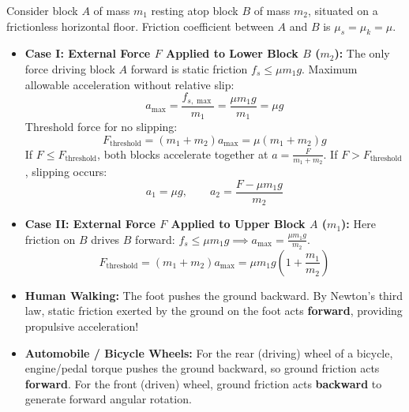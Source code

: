\documentclass[10pt,twoside,openright]{book}
\begin{document}
\begin{usecasebox}
Consider block $A$ of mass $m_1$ resting atop block $B$ of mass $m_2$, situated on a frictionless horizontal floor. Friction coefficient between $A$ and $B$ is $\mu_s = \mu_k = \mu$.
\begin{itemize}
  \item \textbf{Case I: External Force $F$ Applied to Lower Block $B$ ($m_2$):}
  The only force driving block $A$ forward is static friction $f_s \le \mu m_1 g$.
  Maximum allowable acceleration without relative slip:
  \begin{equation}
    a_{\max} = \frac{f_{s,\max}}{m_1} = \frac{\mu m_1 g}{m_1} = \mu g
  \end{equation}
  Threshold force for no slipping:
  \begin{equation}
    F_{\text{threshold}} = (m_1 + m_2)a_{\max} = \mu(m_1 + m_2)g
  \end{equation}
  If $F \le F_{\text{threshold}}$, both blocks accelerate together at $a = \frac{F}{m_1 + m_2}$.
  If $F > F_{\text{threshold}}$, slipping occurs:
  \begin{equation}
    a_1 = \mu g, \qquad a_2 = \frac{F - \mu m_1 g}{m_2}
  \end{equation}
  \item \textbf{Case II: External Force $F$ Applied to Upper Block $A$ ($m_1$):}
  Here friction on $B$ drives $B$ forward: $f_s \le \mu m_1 g \implies a_{\max} = \frac{\mu m_1 g}{m_2}$.
  \begin{equation}
    F_{\text{threshold}} = (m_1 + m_2)a_{\max} = \mu m_1 g\left(1 + \frac{m_1}{m_2}\right)
  \end{equation}
\end{itemize}
\end{usecasebox}

\begin{trapbox}
\begin{itemize}
  \item \textbf{Human Walking:} The foot pushes the ground backward. By Newton's third law, static friction exerted by the ground on the foot acts \textbf{forward}, providing propulsive acceleration!
  \item \textbf{Automobile / Bicycle Wheels:} For the rear (driving) wheel of a bicycle, engine/pedal torque pushes the ground backward, so ground friction acts \textbf{forward}. For the front (driven) wheel, ground friction acts \textbf{backward} to generate forward angular rotation.
\end{itemize}
\end{trapbox}
\end{document}
